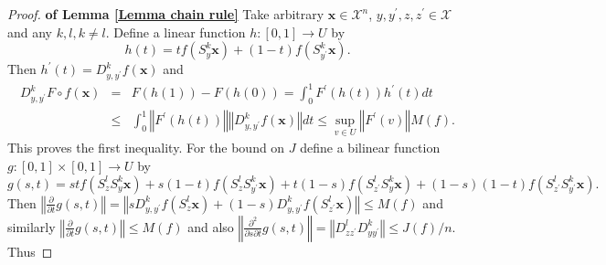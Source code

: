 \documentclass[final,12pt]{colt2018} %
\begin{document}
						\begin{proof}{\bf of Lemma \protect\ref{Lemma chain rule}}
							Take arbitrary $\mathbf{x}\in \mathcal{X}^{n}$, $y,y^{\prime },z,z^{\prime
							}\in \mathcal{X}$ and any $k,l,k\neq l$. Define a linear function $h:\left[
							0,1\right] \rightarrow U$ by%
							\begin{equation*}
							h\left( t\right) =tf\left( S_{y}^{k}\mathbf{x}\right) +\left( 1-t\right)
							f\left( S_{y^{\prime }}^{k}\mathbf{x}\right) . 
							\end{equation*}%
							Then $h^{\prime }\left( t\right) =D_{y,y^{\prime }}^{k}f\left( \mathbf{x}%
							\right) $ and 
							\begin{eqnarray*}
								D_{y,y^{\prime }}^{k}F\circ f\left( \mathbf{x}\right) &=&F\left( h\left(
								1\right) \right) -F\left( h\left( 0\right) \right) =\int_{0}^{1}F^{\prime
								}\left( h\left( t\right) \right) h^{\prime }\left( t\right) dt \\
								&\leq &\int_{0}^{1}\left\Vert F^{\prime }\left( h\left( t\right) \right)
								\right\Vert \left\Vert D_{y,y^{\prime }}^{k}f\left( \mathbf{x}\right)
								\right\Vert dt\leq \sup_{v\in U}\left\Vert F^{\prime }\left( v\right)
								\right\Vert M\left( f\right) .
							\end{eqnarray*}%
							This proves the first inequality. For the bound on $J$ define a bilinear
							function $g:\left[ 0,1\right] \times \left[ 0,1\right] \rightarrow U$ by%
							\begin{equation*}
							g\left( s,t\right) =stf\left( S_{z}^{l}S_{y}^{k}\mathbf{x}\right) +s\left(
							1-t\right) f\left( S_{z}^{l}S_{y^{\prime }}^{k}\mathbf{x}\right) +t\left(
							1-s\right) f\left( S_{z^{\prime }}^{l}S_{y}^{k}\mathbf{x}\right) +\left(
							1-s\right) \left( 1-t\right) f\left( S_{z^{\prime }}^{l}S_{y^{\prime }}^{k}%
							\mathbf{x}\right) . 
							\end{equation*}%
							Then $\left\Vert \frac{\partial }{\partial t}g\left( s,t\right) \right\Vert
							=\left\Vert sD_{y,y^{\prime }}^{k}f\left( S_{z}^{l}\mathbf{x}\right) +\left(
							1-s\right) D_{y,y^{\prime }}^{k}f\left( S_{z^{\prime }}^{l}\mathbf{x}\right)
							\right\Vert \leq M\left( f\right) $ and similarly $\left\Vert \frac{\partial 
							}{\partial t}g\left( s,t\right) \right\Vert \leq M\left( f\right) $ and also 
							$\left\Vert \frac{\partial ^{2}}{\partial s\partial t}g\left( s,t\right)
							\right\Vert =\left\Vert D_{zz^{\prime }}^{l}D_{yy^{\prime }}^{k}\right\Vert
							\leq J\left( f\right) /n$. Thus 

\end{proof}
\end{document}
